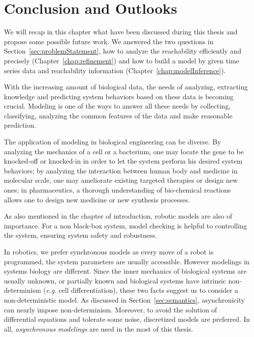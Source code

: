 \chapter{Conclusion and Outlooks}\label{chap:conclusion}
\begin{mybox}
We will recap in this chapter what have been discussed during this thesis and propose some possible future work.
We answered the two questions in Section~\ref{sec:problemStatement}, how to analyze the reachability efficiently and precisely (Chapter~\ref{chap:refinement}) and how to build a model by given time series data and reachability information (Chapter~\ref{chap:modelInference}).

\end{mybox}

With the increasing amount of biological data, the needs of analyzing, extracting knowledge and predicting system behaviors based on these data is becoming crucial.
Modeling is one of the ways to answer all these needs by collecting, classifying, analyzing the common features of the data and make reasonable prediction.

The application of modeling in biological engineering can be diverse. 
By analyzing the mechanics of a cell or a bacterium, one may locate the gene to be knocked-off or knocked-in in order to let the system perform his desired system behaviors;
by analyzing the interaction between human body and medicine in molecular scale, one may ameliorate existing targeted therapies or design new ones;
in pharmaceutics, a thorough understanding of bio-chemical reactions allows one to design new medicine or new synthesis processes.

As also mentioned in the chapter of introduction, robotic models are also of importance.
For a non black-box system, model checking is helpful to controlling the system, ensuring system safety and robustness.

In robotics, we prefer synchronous models as every move of a robot is programmed, the system parameters are usually accessible.
However modelings in systems biology are different.
Since the inner mechanics of biological systems are usually unknown, or partially known and biological systems have intrinsic non-determinism (\textit{e.g.} cell differentiation), 
these two facts suggest us to consider a non-deterministic model.
As discussed in Section~\ref{sec:semantics}, asynchronicity can nearly impose non-determinism.
Moreover, to avoid the solution of differential equations and tolerate some noise, discretized models are preferred.
In all, \textit{asynchronous  modelings} are used in the most of this thesis.

